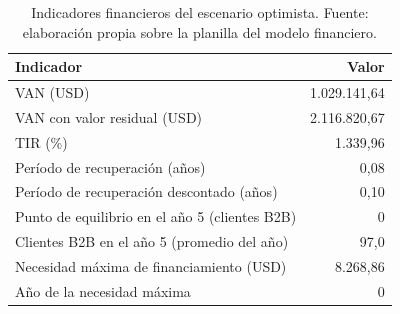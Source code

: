 \begin{table}[t]
  \centering
  \small
  \caption{Indicadores financieros del escenario optimista. Fuente: elaboración propia sobre la planilla del modelo financiero.}
  \label{tab:financiero-optimista-indicadores}
  \begin{tabular}{l r}
    \hline
    \textbf{Indicador} & \textbf{Valor} \\
    \hline
    VAN (USD) & 1.029.141,64 \\
    VAN con valor residual (USD) & 2.116.820,67 \\
    TIR (\%) & 1.339,96 \\
    Período de recuperación (años) & 0,08 \\
    Período de recuperación descontado (años) & 0,10 \\
    Punto de equilibrio en el año 5 (clientes B2B) & 0 \\
    Clientes B2B en el año 5 (promedio del año) & 97,0 \\
    Necesidad máxima de financiamiento (USD) & 8.268,86 \\
    Año de la necesidad máxima & 0 \\
    \hline
  \end{tabular}
\end{table}
